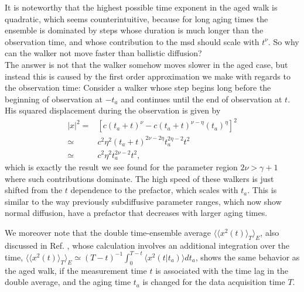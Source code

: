 It is noteworthy that the highest possible time exponent in the aged walk is quadratic, which seems counterintuitive, because for long aging times the ensemble is dominated by steps whose duration is much longer than the observation time, and whose contribution to the \gls*{msd} should scale with $t^{\nu}$. So why can the walker not move faster than ballistic diffusion? \\
The answer is not that the walker somehow moves slower in the aged case, but instead this is caused by the first order approximation we make with regards to the observation time: Consider a walker whose step begins long before the beginning of observation at $-t_a$ and continues until the end of observation at $t$. His squared displacement during the observation is given by
%
\begin{align}
|x|^2 =& [c (t_a+t)^{\nu} - c (t_a+t)^{\nu-\eta} (t_a)^{\eta} ]^2\\
\simeq & c^2 \eta^2  (t_a+t)^{2\nu-2\eta} t_a^{2 \eta -2} t^2 \\
\simeq & c^2 \eta^2 t_a^{2 \nu -2} t^2 ,
\end{align}
%
which is exactly the result we see found for the parameter region $2\nu > \gamma+1$ where such contributions dominate. The high speed of these walkers is just shifted from the $t$ dependence to the prefactor, which scales with $t_a$. This is similar to the way previously subdiffusive parameter ranges, which now show normal diffusion, have a prefactor that decreases with larger aging times.

We moreover note that the double time-ensemble average $\langle \langle x^2 (t) \rangle_T \rangle_E$, also discussed in Ref. 
\cite{radons2018}, 
whose calculation involves an additional integration over the time, $\langle \langle x^2 (t) \rangle_T \rangle_E \simeq (T-t)^{-1} \int_0^{T-t} \langle x^2 (t|t_a) \rangle dt_a$, shows the same behavior as the aged walk, if the measurement time $t$ is associated with the time lag in the double average, and the aging time $t_a$ is changed for the data acquisition time $T$.   

